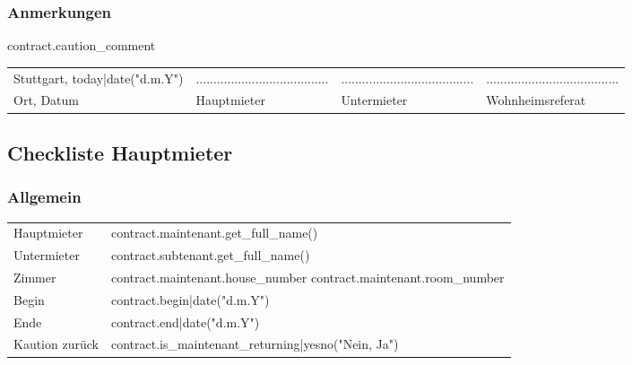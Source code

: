 \documentclass[9pt,pdftex,a4paper]{article}
\newcommand{\signLine}{......................................}
\begin{document}
{{{{{{%
\subsubsection*{Anmerkungen}

{{ contract.caution_comment }}

{%

\vfill

\begin{tabularx}{\textwidth}{@{}YYYY@{}}
Stuttgart, {{ today|date("d.m.Y") }} & \signLine & \signLine & \signLine\\
Ort, Datum &  Hauptmieter& Untermieter & Wohnheimsreferat\\
\end{tabularx}

{%


%
%

\newpage

\subsection*{Checkliste Hauptmieter}

\subsubsection*{Allgemein}
\begin{tabularx}{\textwidth}{XX}
Hauptmieter & {{ contract.maintenant.get_full_name() }}\\
Untermieter &  {{ contract.subtenant.get_full_name() }}\\
Zimmer & {{ contract.maintenant.house_number }} {{ contract.maintenant.room_number }}\\
Begin & {{ contract.begin|date("d.m.Y") }}\\
Ende & {{ contract.end|date("d.m.Y") }}\\
Kaution zurück & {{ contract.is_maintenant_returning|yesno("Nein, Ja") }}\\
\end{tabularx}

}}}}}}}}
\end{document}
